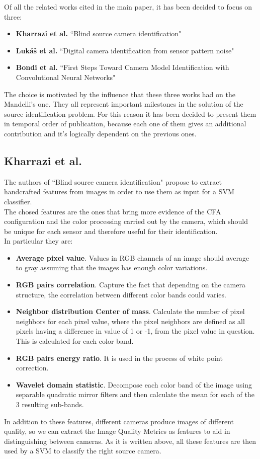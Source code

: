Of all the related works cited in the main paper, it has been decided to focus on three:
\begin{itemize}
    \item \textbf{Kharrazi et al.} ``Blind source camera identification"\cite{Kharrazi}
    \item \textbf{Lukáš et al.} ``Digital camera identification from sensor pattern noise"\cite{Lukas}
    \item \textbf{Bondi et al.} ``First Steps Toward Camera Model Identification with Convolutional Neural Networks"\cite{Bondi}
\end{itemize}
The choice is motivated by the influence that these three works had on the Mandelli's one.
They all represent important milestones in the solution of the source identification problem.
For this reason it has been decided to present them in temporal order of publication, because each one of them gives an additional contribution and it's logically dependent on the previous ones.

\subsection{Kharrazi et al.}
The authors of ``Blind source camera identification" propose to extract handcrafted features from images in order to use them as input for a SVM classifier.
\\The chosed features are the ones that bring more evidence of the CFA configuration and the color processing carried out by the camera, which should be unique for each sensor and therefore useful for their identification.
\\In particular they are:
\begin{itemize}
    \item \textbf{Average pixel value}. Values in RGB channels of an image should average to gray assuming that the images has enough color variations.
    \item \textbf{RGB pairs correlation}. Capture the fact that depending on the camera structure, the correlation between different color bands could varies.
    \item \textbf{Neighbor distribution Center of mass}. Calculate the number of pixel neighbors for each pixel value, where the pixel neighbors are defined as all pixels having a difference in value of 1 or -1, from the pixel value in question. This is calculated for each color band.
    \item \textbf{RGB pairs energy ratio}. It is used in the process of white point correction.
    \item \textbf{Wavelet domain statistic}. Decompose each color band of the image using separable quadratic mirror filters and then calculate the mean for each of the 3 resulting sub-bands.
\end{itemize}
In addition to these features, different cameras produce images of different quality, so we can extract the Image Quality Metrics as features to aid in distinguishing between cameras. 
As it is written above, all these features are then used by a SVM to classify the right source camera.

